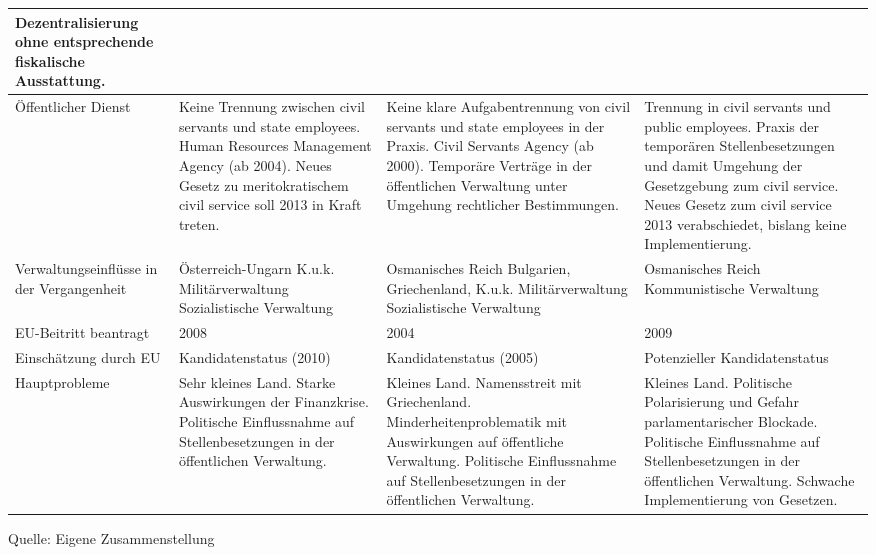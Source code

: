 \begin{longtable}[H]{|L{24mm}|C{34mm}|C{34mm}|C{34mm}|}
Dezentralisierung ohne entsprechende fiskalische Ausstattung. \\\hline
Öffentlicher Dienst&
Keine Trennung zwischen civil servants und state employees.
Human Resources Management Agency 
(ab 2004).
Neues Gesetz zu meritokratischem civil service soll 2013 in Kraft treten.&
 Keine klare Aufgabentrennung von civil servants und state employees in der Praxis.
Civil Servants Agency (ab 2000).
Temporäre Verträge in der öffentlichen Verwaltung unter Umgehung rechtlicher Bestimmungen.&
Trennung in civil servants und public employees. 
Praxis der temporären Stellenbesetzungen und damit Umgehung der Gesetzgebung zum civil service.
Neues Gesetz zum civil service 2013 verabschiedet, bislang keine Implementierung.\\\hline
Verwaltungseinflüsse in der Vergangenheit&
Österreich-Ungarn
K.u.k. Militärverwaltung
Sozialistische Verwaltung &
Osmanisches Reich
Bulgarien, Griechenland, 
K.u.k. Militärverwaltung
Sozialistische Verwaltung &
Osmanisches Reich 
Kommunistische Verwaltung \\\hline
EU-Beitritt beantragt&
2008&
2004&
2009\\\hline
Einschätzung durch EU&
Kandidatenstatus (2010)&
Kandidatenstatus (2005)&
Potenzieller Kandidatenstatus\\\hline
Hauptprobleme&
Sehr kleines Land.
Starke Auswirkungen der Finanzkrise.
Politische Einflussnahme auf Stellenbesetzungen in der öffentlichen Verwaltung.&
Kleines Land.
Namensstreit mit Griechenland.
Minderheitenproblematik mit Auswirkungen auf öffentliche Verwaltung.
Politische Einflussnahme auf Stellenbesetzungen in der öffentlichen Verwaltung.&
Kleines Land.
Politische Polarisierung und Gefahr parlamentarischer Blockade.
Politische Einflussnahme auf Stellenbesetzungen in der öffentlichen Verwaltung.
Schwache Implementierung von Gesetzen.\\\hline

\end{longtable}
Quelle: Eigene Zusammenstellung

